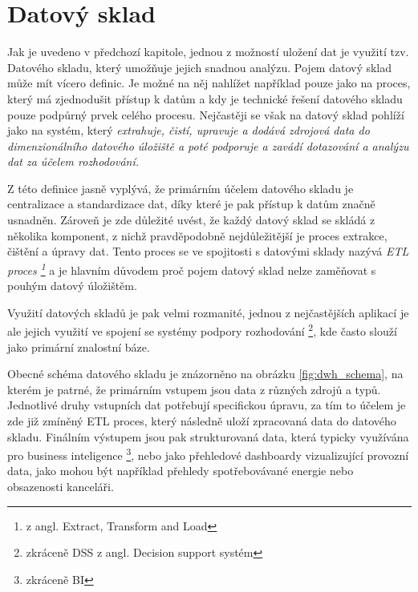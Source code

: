 \documentclass[
  digital,     %
  twoside,     %
  lof,         %
  lot,         %
]{fithesis4}
\begin{document}
\chapter{Datový sklad}
\label{dwh}
Jak je uvedeno v předchozí kapitole, jednou z možností uložení dat je využití tzv. Datového skladu, který umožňuje jejich snadnou analýzu. Pojem datový sklad může mít vícero definic. Je možné na něj nahlížet například pouze jako na proces, který má zjednodušit přístup k datům a kdy je technické řešení datového skladu pouze podpůrný prvek celého procesu. Nejčastěji se však na datový sklad pohlíží jako na systém, který \emph{extrahuje, čistí, upravuje a dodává zdrojová data do dimenzionálního datového úložiště a poté podporuje a zavádí dotazování a analýzu dat za účelem rozhodování.} \parencite[s.~23]{Kimballc2004}

Z této definice jasně vyplývá, že primárním účelem datového skladu je centralizace a standardizace dat, díky které je pak přístup k datům značně usnadněn. Zároveň je zde důležité uvést, že každý datový sklad se skládá z několika komponent, z nichž pravděpodobně nejdůležitější je proces extrakce, čištění a úpravy dat. Tento proces se ve spojitosti s datovými sklady nazývá \emph{ETL proces \footnote{z angl. Extract, Transform and Load} }a je hlavním důvodem proč pojem datový sklad nelze zaměňovat s pouhým datový úložištěm. \parencite[s.~24]{Kimballc2004}

Využití datových skladů je pak velmi rozmanité, jednou z nejčastějších aplikací je ale jejich využití ve spojení se systémy podpory rozhodování \footnote{zkráceně DSS z angl. Decision support
systém}, kde často slouží jako primární znalostní báze. \parencite[s.~2]{Inmon2005}

Obecné schéma datového skladu je znázorněno na obrázku \ref{fig:dwh_schema}, na kterém je patrné, že primárním vstupem jsou data z různých zdrojů a typů. Jednotlivé druhy vstupních dat potřebují specifickou úpravu, za tím to účelem je zde již zmíněný ETL proces, který následně uloží zpracovaná data do datového skladu. Finálním výstupem jsou pak strukturovaná data, která typicky využívána pro business inteligence \footnote{zkráceně BI}, nebo jako přehledové dashboardy vizualizující provozní data, jako mohou být například přehledy spotřebovávané energie nebo obsazenosti kanceláři.
\end{document}
